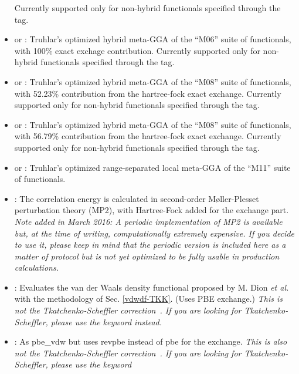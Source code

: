 \begin{itemize}
    Currently supported only for non-hybrid functionals specified through the 
    tag. 
  \item {} or : Truhlar's optimized hybrid meta-GGA of the ``M06'' suite of
    functionals, with 100\% exact exchage contribution. \cite{ZhaoTruhlar06_M06-HF}
    Currently supported only for non-hybrid functionals specified through the  tag.
  \item {} or : Truhlar's optimized hybrid meta-GGA of the ``M08'' suite of
    functionals, with 52.23\% contribution from the hartree-fock exact exchange. \cite{ZhaoTruhlar08_M08-HX_M08-SO}
    Currently supported only for non-hybrid functionals specified through the  tag.
  \item {} or : Truhlar's optimized hybrid meta-GGA of the ``M08'' suite of
    functionals, with 56.79\% contribution from the hartree-fock exact exchange. \cite{ZhaoTruhlar08_M08-HX_M08-SO}
    Currently supported only for non-hybrid functionals specified through the  tag.
  \item {} or : Truhlar's optimized range-separated local meta-GGA of the ``M11'' suite of
  functionals. \cite{PeveratiTruhlar11_M11-L}
  \item {} : The correlation energy is calculated in second-order
    M{\o}ller-Plesset perturbation theory (MP2), with Hartree-Fock added for
    the exchange part. \emph{Note added in March 2016: A periodic
      implementation of MP2 is available but, at the time of writing,
      computationally extremely expensive. If you decide to use it,
      please keep in mind that the periodic version is included here
      as a matter of protocol but is not yet optimized to be fully
      usable in production calculations.}
  \item {} : Evaluates the van der Waals density
    functional proposed by M. Dion {\it et al.}~\cite{Dion04} with the
    methodology of Sec. \ref{vdwdf-TKK}. (Uses PBE exchange.) \emph{This is
    \emph{not} the Tkatchenko-Scheffler correction~\cite{TS-vdw}. If
    you are looking for Tkatchenko-Scheffler, please use the keyword
     instead.}
  \item {} : As pbe\_vdw but uses revpbe instead of pbe
    for the exchange. \emph{This is also
    \emph{not} the Tkatchenko-Scheffler correction~\cite{TS-vdw}. If
    you are looking for Tkatchenko-Scheffler, please use the keyword
}
\end{itemize}

